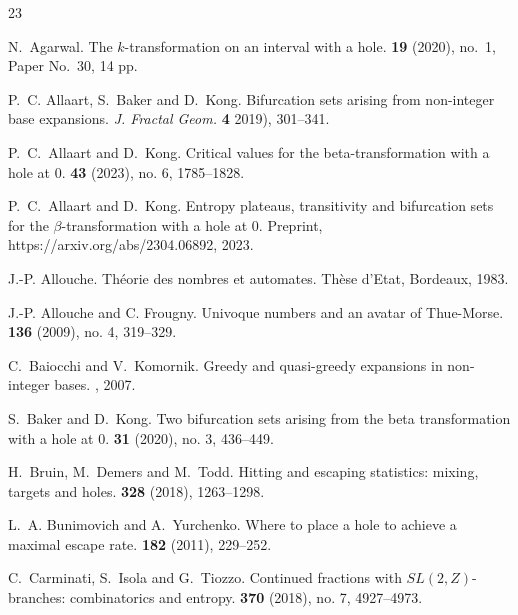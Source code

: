 \documentclass[12pt]{amsart}
\theoremstyle{definition}
\theoremstyle{remark}
\numberwithin{equation}{section}
\begin{document}
{\begin{thebibliography}{23}

N.~Agarwal.
\newblock The $k$-transformation on an interval with a hole.
 {\bf 19} (2020), no.~1, Paper No.~30, 14 pp.

P.~C. Allaart, S.~Baker and D.~Kong.
\newblock Bifurcation sets arising from non-integer base expansions.
\newblock \emph{J. Fractal Geom.} {\bf 4} 2019), 301--341.

P.~C.~Allaart and D.~Kong.
\newblock Critical values for the beta-transformation with a hole at 0.
 {\bf 43} (2023), no. 6, 1785--1828.

P.~C.~Allaart and D.~Kong.
\newblock Entropy plateaus, transitivity and bifurcation sets for the $\beta$-transformation with a hole at $0$.
\newblock Preprint, https://arxiv.org/abs/2304.06892, 2023.

J.-P. Allouche.
\newblock Th\'eorie des nombres et automates. 
\newblock Th\`ese d'Etat, Bordeaux, 1983.

J.-P. Allouche and C. Frougny.
\newblock Univoque numbers and an avatar of Thue-Morse.
 {\bf 136} (2009), no. 4, 319--329.

C.~Baiocchi and V.~Komornik.
\newblock Greedy and quasi-greedy expansions in non-integer bases.
, 2007.

S.~Baker and D.~Kong.
\newblock Two bifurcation sets arising from the beta transformation with a hole at 0.
 {\bf 31} (2020), no. 3, 436--449.

H.~Bruin, M.~Demers and M.~Todd.
\newblock Hitting and escaping statistics: mixing, targets and holes.
 {\bf 328} (2018), 1263--1298.

L.~A. Bunimovich and A.~Yurchenko.
\newblock Where to place a hole to achieve a maximal escape rate.
 {\bf 182} (2011), 229--252.

C.~Carminati, S.~Isola and G.~Tiozzo.
\newblock Continued fractions with {$SL(2,Z)$}-branches: combinatorics and
  entropy.
 {\bf 370} (2018), no. 7, 4927--4973.


\end{thebibliography}}
\end{document}
